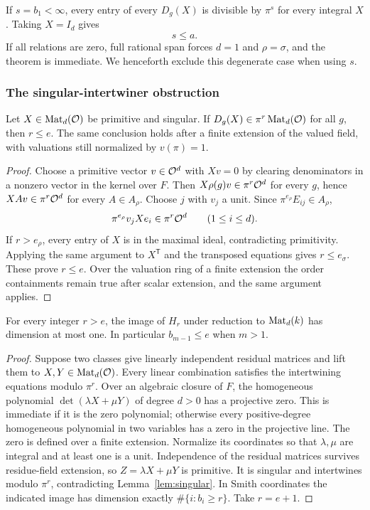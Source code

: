 If $s=b_1<\infty$, every entry of every $D_g(X)$ is divisible by $\pi^s$
for every integral $X$. Taking $X=I_d$ gives
\begin{equation}\label{eq:mintrace}
 s\le a.
\end{equation}
If all relations are zero, full rational span forces $d=1$ and
$\rho=\sigma$, and the theorem is immediate. We henceforth exclude this
degenerate case when using $s$.

\subsubsection{The singular-intertwiner obstruction}

\begin{lemma}\label{lem:singular}
Let $X\in\operatorname{Mat}_d(\mathcal O)$ be primitive and singular. If
$D_g(X)\in\pi^r\operatorname{Mat}_d(\mathcal O)$ for all $g$, then $r\le e$.
The same conclusion holds after a finite extension of the valued field,
with valuations still normalized by $v(\pi)=1$.
\end{lemma}
\begin{proof}
Choose a primitive vector $v\in\mathcal O^d$ with $Xv=0$ by clearing denominators
in a nonzero vector in the kernel over $F$. Then
$X\rho(g)v\in\pi^r\mathcal O^d$ for every $g$, hence
$XAv\in\pi^r\mathcal O^d$ for every $A\in A_\rho$. Choose $j$ with $v_j$ a
unit. Since $\pi^{e_\rho}E_{ij}\in A_\rho$,
\[
 \pi^{e_\rho}v_jXe_i\in\pi^r\mathcal O^d\qquad(1\le i\le d).
\]
If $r>e_\rho$, every entry of $X$ is in the maximal ideal, contradicting
primitivity. Applying the same argument to $X^{\mathsf T}$ and the
transposed equations gives $r\le e_\sigma$. These prove $r\le e$.
Over the valuation ring of a finite extension the order containments
remain true after scalar extension, and the same argument applies.
\end{proof}

\begin{lemma}\label{lem:pencil}
For every integer $r>e$, the image of $H_r$ under reduction to
$\operatorname{Mat}_d(k)$ has dimension at most one. In particular
$b_{m-1}\le e$ when $m>1$.
\end{lemma}
\begin{proof}
Suppose two classes give linearly independent residual matrices and lift
them to $X,Y\in\operatorname{Mat}_d(\mathcal O)$. Every linear combination satisfies the
intertwining equations modulo $\pi^r$. Over an algebraic closure of $F$,
the homogeneous polynomial $\det(\lambda X+\mu Y)$ of degree $d>0$
has a projective zero. This is immediate if it is the zero polynomial;
otherwise every positive-degree homogeneous polynomial in two variables
has a zero in the projective line. The zero is defined over a finite
extension. Normalize its coordinates so that $\lambda,\mu$ are integral
and at least one is a unit. Independence of the residual matrices survives
residue-field extension, so $Z=\lambda X+\mu Y$ is primitive. It is
singular and intertwines modulo $\pi^r$, contradicting
Lemma~\ref{lem:singular}. In Smith coordinates the indicated image has
dimension exactly $\#\{i:b_i\ge r\}$. Take $r=e+1$.
\end{proof}

